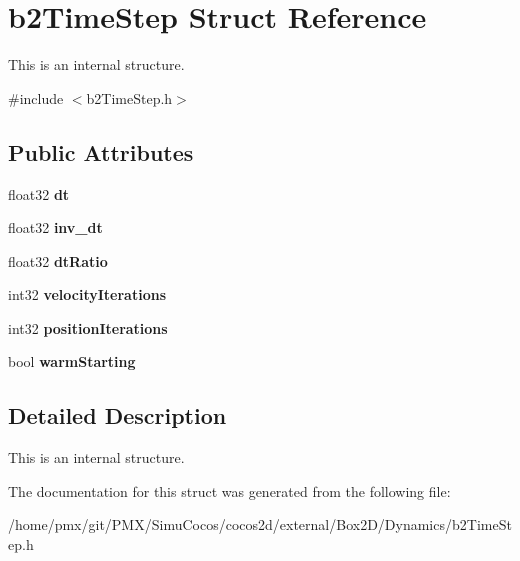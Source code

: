 \hypertarget{structb2TimeStep}{}\section{b2\+Time\+Step Struct Reference}
\label{structb2TimeStep}


This is an internal structure.  




{\ttfamily \#include $<$b2\+Time\+Step.\+h$>$}

\subsection*{Public Attributes}
\begin{DoxyCompactItemize}
\item 
\mbox{\label{structb2TimeStep_a74e20836809accba98a4445fbcb3427c}} 
float32 {\bfseries dt}
\item 
\mbox{\label{structb2TimeStep_ac2d652bde6d303149db9d0a461bc22ba}} 
float32 {\bfseries inv\+\_\+dt}
\item 
\mbox{\label{structb2TimeStep_aa67bc8a12ffafce918d9e6a0d8d3f203}} 
float32 {\bfseries dt\+Ratio}
\item 
\mbox{\label{structb2TimeStep_a9f2a0ccd8029681f254003b66f201ce1}} 
int32 {\bfseries velocity\+Iterations}
\item 
\mbox{\label{structb2TimeStep_ab7938eec17a1a3d7961d8364e150f1be}} 
int32 {\bfseries position\+Iterations}
\item 
\mbox{\label{structb2TimeStep_add80f7f86c84f005ad817f0313df3f32}} 
bool {\bfseries warm\+Starting}
\end{DoxyCompactItemize}


\subsection{Detailed Description}
This is an internal structure. 

The documentation for this struct was generated from the following file\+:\begin{DoxyCompactItemize}
\item 
/home/pmx/git/\+P\+M\+X/\+Simu\+Cocos/cocos2d/external/\+Box2\+D/\+Dynamics/b2\+Time\+Step.\+h\end{DoxyCompactItemize}
